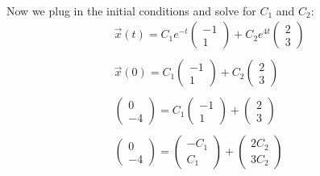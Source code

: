 \documentclass{jhwhw}
\begin{document}
\\ \\ \\ \\ \\ \\ \\ \\ \\ \\ \\
Now we plug in the initial conditions and solve for \(C_1\) and \(C_2\):
\\
\begin{align*}
    \vec x(t) = C_1 e^{-t} \begin{pmatrix} -1 \\ 1 \end{pmatrix} + C_2 e^{4t} \begin{pmatrix} 2 \\ 3 \end{pmatrix} \\ \\
    \vec x(0) = C_1 \begin{pmatrix} -1 \\ 1 \end{pmatrix} + C_2 \begin{pmatrix} 2 \\ 3 \end{pmatrix} \\ \\
    \begin{pmatrix} 0 \\ -4 \end{pmatrix} = C_1 \begin{pmatrix} -1 \\ 1 \end{pmatrix} + \begin{pmatrix} 2 \\ 3 \end{pmatrix} \\ \\
    \begin{pmatrix} 0 \\ -4 \end{pmatrix} = \begin{pmatrix} -C_1 \\ C_1 \end{pmatrix} + \begin{pmatrix} 2C_2 \\ 3C_2 \end{pmatrix} \\ \\

\end{align*}
\end{document}
